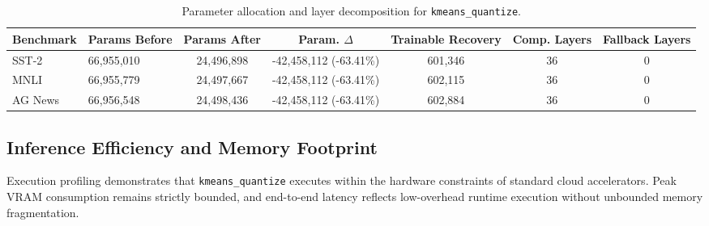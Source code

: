 \begin{table}[t]
\centering
\small
\begin{tabular}{llccccc}
\toprule
\textbf{Benchmark} & \textbf{Params Before} & \textbf{Params After} & \textbf{Param. $\Delta$} & \textbf{Trainable Recovery} & \textbf{Comp. Layers} & \textbf{Fallback Layers} \\
\midrule
SST-2 & 66,955,010 & 24,496,898 & -42,458,112 (-63.41\%) & 601,346 & 36 & 0 \\
MNLI & 66,955,779 & 24,497,667 & -42,458,112 (-63.41\%) & 602,115 & 36 & 0 \\
AG News & 66,956,548 & 24,498,436 & -42,458,112 (-63.41\%) & 602,884 & 36 & 0 \\
\bottomrule
\end{tabular}
\caption{Parameter allocation and layer decomposition for \texttt{kmeans\_quantize}.}
\label{tab:params\_kmeans\_quantize}
\end{table}

\subsection{Inference Efficiency and Memory Footprint}
Execution profiling demonstrates that \texttt{kmeans\_quantize} executes within the hardware constraints of standard cloud accelerators. Peak VRAM consumption remains strictly bounded, and end-to-end latency reflects low-overhead runtime execution without unbounded memory fragmentation.
